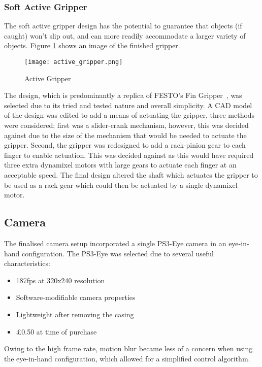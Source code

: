 \documentclass[conference]{IEEEtran}
\begin{document}
\subsubsection{Soft Active Gripper}
The soft active gripper design has the potential to guarantee that objects (if caught) won’t slip out, and can more readily accommodate a larger variety of objects. Figure \ref{active_gripper} shows an image of the finished gripper.
\begin{figure}\label{active_gripper}
\centering
\texttt{[image: active\_gripper.png]}
\caption{Active Gripper}
\end{figure}
The design, which is predominantly a replica of FESTO’s Fin Gripper~\cite{festofin}, was selected due to its tried and tested nature and overall simplicity. A CAD model of the design was edited to add a means of actuating the gripper, three methods were considered; first was a slider-crank mechanism, however, this was decided against due to the size of the mechanism that would be needed to actuate the gripper. Second, the gripper was redesigned to add a rack-pinion gear to each finger to enable actuation. This was decided against as this would have required three extra dynamixel motors with large gears to actuate each finger at an acceptable speed. The final design altered the shaft which actuates the gripper to be used as a rack gear which could then be actuated by a single dynamixel motor.




\subsection{Camera}\label{camera}
The finalised camera setup incorporated a single PS3-Eye camera in an eye-in-hand configuration. The PS3-Eye was selected due to several useful characteristics:
\begin{itemize}
	\item 187fps at 320x240 resolution
	
	\item Software-modifiable camera properties
	
	\item Lightweight after removing the casing
	
	\item \pounds0.50 at time of purchase
\end{itemize}

Owing to the high frame rate, motion blur became less of a concern when using the eye-in-hand configuration, which allowed for a simplified control algorithm. 
\end{document}
